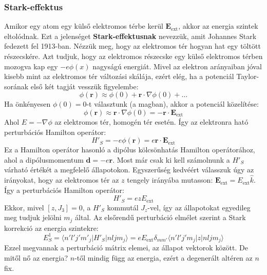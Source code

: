 \documentclass[../main.tex]{subfiles}
\begin{document}
\subsubsection{Stark-effektus}
Amikor egy atom egy külső elektromos térbe kerül $\mathbf{E}_{\text{ext}}$, akkor az energia szintek eltolódnak. Ezt a jelenséget \textbf{Stark-effektusnak} nevezzük, amit Johannes Stark fedezett fel 1913-ban.
Nézzük meg, hogy az elektromos tér hogyan hat egy töltött részecskére. Azt tudjuk, hogy az elektromos részecske egy külső elektromos térben mozogva kap egy $-e\phi(x)$ nagyságú energiát.
Mivel az elektron arányaiban jóval kisebb mint az elektromos tér változási skálája, ezért elég, ha a potenciál Taylor-sorának első két tagját vesszük figyelembe:
\begin{equation}
    \phi(\mathbf{r}) \approx \phi(0) + \mathbf{r} \cdot \nabla \phi(0) + \ldots
\end{equation}
Ha önkényesen $\phi(0) = 0$-t választunk (a magban), akkor a potenciál közelítése:
\begin{equation}
    \phi(\mathbf{r}) \approx \mathbf{r} \cdot \nabla \phi(0) = - \mathbf{r} \cdot \mathbf{E}_{\text{ext}}
\end{equation}
Ahol $E = - \nabla \phi$ az elektromos tér, homogén tér esetén. Így az elektronra ható perturbációs Hamilton operátor:
\begin{equation}
    H'_{S} = - e \phi(\mathbf{r}) = e \mathbf{r} \cdot \mathbf{E}_{\text{ext}}
\end{equation}
Ez a Hamilton operátor hasonló a dipólus kölcsönhatás Hamilton operátorához, ahol a dipólusmomentum $\mathbf{d} = - e \mathbf{r}$. Most már csak ki kell számolnunk a $H'_{S}$ várható értékét a megfelelő állapotokon.
Egyszerűség kedvéért válasszuk úgy az irányokat, hogy az elektromos tér az $z$ tengely irányába mutasson: $\mathbf{E}_{\text{ext}} = E_{\text{ext}} \hat{k}$. Így a perturbációs Hamilton operátor:
\begin{equation}
    H'_{S} = e z E_{\text{ext}}
\end{equation}
Ekkor, mivel $[z, J_3] = 0$, a $H'_{S}$ kommutál $J_z$-vel, így az állapotokat egyedileg meg tudjuk jelölni $m_j$ által. Az elsőrendű perturbáció elmélet szerint a Stark korrekció az energia szintekre:
\begin{equation}
    E^1_{S} = \langle n' l' j' m'_j | H'_{S} | n l j m_j \rangle = e E_{\text{ext}} \delta_{mm'}\langle n' l' j' m_j | z | n l j m_j \rangle
\end{equation}
Ezzel megvannak a perturbáció mátrix elemei, az állapot vektorok között. De mitől nő az energia? $n$-től mindig függ az energia, ezért a degenerált altéren az $n$ fix.
\end{document}
